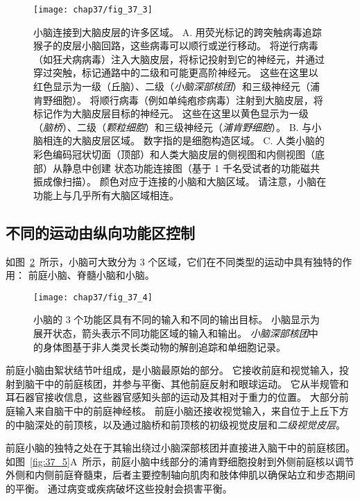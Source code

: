 \begin{figure}[htbp]
	\centering
	\texttt{[image: chap37/fig\_37\_3]}
	\caption{小脑连接到大脑皮层的许多区域\cite{bostan2013cerebellar}。
		A. 用荧光标记的跨突触病毒追踪猴子的皮层小脑回路，这些病毒可以顺行或逆行移动。
		将逆行病毒（如狂犬病病毒）注入大脑皮层，将标记投射到它的神经元，并通过穿过突触，标记通路中的二级和可能更高阶神经元。
		这些在这里以红色显示为一级（丘脑）、二级（\textit{小脑深部核团}）和三级神经元（浦肯野细胞）。
		将顺行病毒（例如单纯疱疹病毒）注射到大脑皮层，将标记作为大脑皮层目标的神经元。
		这些在这里以黄色显示为一级（\textit{脑桥}）、二级（\textit{颗粒细胞}）和三级神经元（\textit{浦肯野细胞}）。
		B. 与小脑相连的大脑皮层区域。 数字指的是细胞构造区域。
		C. 人类小脑的彩色编码冠状切面（顶部）和人类大脑皮层的侧视图和内侧视图（底部）从静息中创建 状态功能连接图（基于 1 千名受试者的功能磁共振成像扫描）。
		颜色对应于连接的小脑和大脑区域。
		请注意，小脑在功能上与几乎所有大脑区域相连。}
	\label{fig:37_3}
\end{figure}



\subsection{不同的运动由纵向功能区控制}

如图~\ref{fig:37_4}~所示，小脑可大致分为 3 个区域，它们在不同类型的运动中具有独特的作用：
前庭小脑、脊髓小脑和小脑。


\begin{figure}[htbp]
	\centering
	\texttt{[image: chap37/fig\_37\_4]}
	\caption{小脑的 3 个功能区具有不同的输入和不同的输出目标。
		小脑显示为展开状态，箭头表示不同功能区域的输入和输出。
		\textit{小脑深部核团}中的身体图基于非人类灵长类动物的解剖追踪和单细胞记录\cite{brooks1981handbook}。}
	\label{fig:37_4}
\end{figure}


前庭小脑由絮状结节叶组成，是小脑最原始的部分。
它接收前庭和视觉输入，投射到脑干中的前庭核团，并参与平衡、其他前庭反射和眼球运动。
它从半规管和耳石器官接收信息，这些器官感知头部的运动及其相对于重力的位置。
大部分前庭输入来自脑干中的前庭神经核。
前庭小脑还接收视觉输入，来自位于上丘下方的中脑深处的前顶核，以及通过脑桥和前顶核的初级视觉皮层和\textit{二级视觉皮层}。


前庭小脑的独特之处在于其输出绕过小脑深部核团并直接进入脑干中的前庭核团。
如图~\ref{fig:37_5}A~所示，前庭小脑中线部分的浦肯野细胞投射到外侧前庭核以调节外侧和内侧前庭脊髓束，后者主要控制轴向肌肉和肢体伸肌以确保站立和步态期间的平衡。
通过病变或疾病破坏这些投射会损害平衡。


